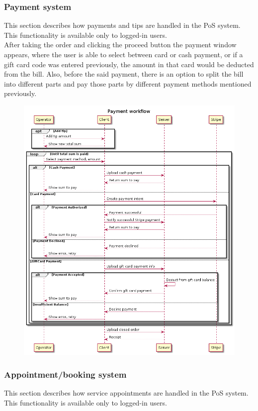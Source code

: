 \documentclass{article}
\begin{document}
    \subsubsection{Payment system} %
    This section describes how payments and tips are handled in the PoS system. This functionality is available only to logged-in users.\\
    After taking the order and clicking the proceed button the payment window appears, where the user is able to select between card or cash payment, or if a gift card code was entered previously, the amount in that card would be deducted from the bill. Also, before the said payment, there is an option to split the bill into different parts and pay those parts by different payment methods mentioned previously.
    \begin{figure}[H]
        \centering
        \includegraphics[width=0.7\linewidth]{PSP/lab-1/diagrams/sequence/payment.png}
        \caption{}
        \label{}
    \end{figure}
    
    \subsubsection{Appointment/booking system}
    This section describes how service appointments are handled in the PoS system. This functionality is available only to logged-in users.\\
    
\end{document}
